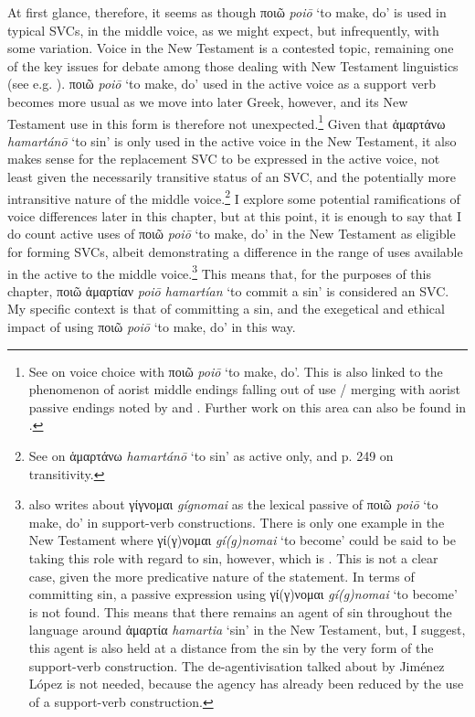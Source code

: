 \documentclass[output=paper,colorlinks,citecolor=brown]{langscibook}
\begin{document}
At first glance, therefore, it seems as though ποιῶ \textit{poiō} ‘to make, do' is used in typical
SVCs, in the middle voice, as we might expect, but infrequently, with
some variation. 
Voice in the New Testament is a contested topic,
remaining one of the key issues for debate among those dealing with New
Testament linguistics (see e.g. \citealt{tronci_aorist_2018, black_linguistics_2020}). ποιῶ \textit{poiō} ‘to make, do' used in the active voice as a support verb becomes
more usual as we move into later Greek, however, and its New Testament
use in this form is therefore not unexpected.\footnote{See \citet{cock__1981} on voice choice with ποιῶ \textit{poiō} ‘to make, do'. This is also linked to the
  phenomenon of aorist middle endings falling out of use / merging with
  aorist passive endings noted by \citet[103]{horrocks_greek_2010} and \citet[251–252]{tronci_aorist_2018}. Further work on this area can also be found in \citet{vives_cuesta_support-verb_2022}.} Given that ἁμαρτάνω \textit{hamartánō} ‘to sin' is only
used in the active voice in the New Testament, it also makes sense for
the replacement SVC to be expressed in the active voice, not least given
the necessarily transitive status of an SVC, and the potentially more
intransitive nature of the middle voice.\footnote{See \citet[245]{tronci_aorist_2018}
  on ἁμαρτάνω \textit{hamartánō} ‘to sin' as active only, and p. 249 on transitivity.} I explore some
potential ramifications of voice differences later in this chapter, but
at this point, it is enough to say that I do count active uses of ποιῶ \textit{poiō} ‘to make, do'
in the New Testament as eligible for forming SVCs, albeit demonstrating a
difference in the range of uses available in the active to the middle
voice.\footnote{\citet{jimenez_lopez__2021} also writes about γίγνομαι \textit{gígnomai} as the lexical
  passive of ποιῶ \textit{poiō} ‘to make, do' in support-verb constructions.
  There is only one example in the New Testament where γί(γ)νομαι \textit{gí(g)nomai} ‘to become' could
  be said to be taking this role with regard to sin, however, which is
  . This is not a clear case, given the more predicative
  nature of the statement. In terms of committing sin, a passive
  expression using γί(γ)νομαι \textit{gí(g)nomai} ‘to become' is not found. This means that there
  remains an agent of sin throughout the language around ἁμαρτία \textit{hamartia} ‘sin' in the
  New Testament, but, I suggest, this agent is also held at a distance
  from the sin by the very form of the support-verb construction.
  The
  de-agentivisation talked about by Jiménez López is not needed, because
  the agency has already been reduced by the use of a support-verb
  construction.} This
means that, for the purposes of this chapter, ποιῶ ἁμαρτίαν \textit{poiō hamartían} ‘to commit a sin' is
considered an SVC. My specific context is that of committing a sin, and
the exegetical and ethical impact of using ποιῶ \textit{poiō} ‘to make, do' in this way.
\end{document}
